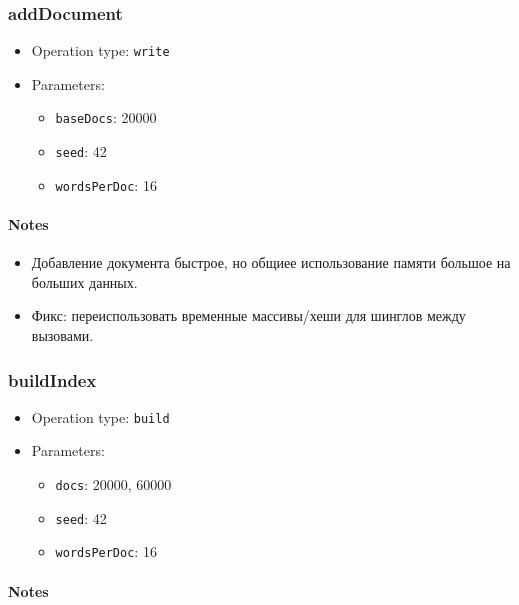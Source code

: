 \documentclass[
  10pt,
]{article}
\providecommand{\tightlist}{%
  \setlength{\itemsep}{0pt}\setlength{\parskip}{0pt}}
\begin{document}
\subsubsection{addDocument}\label{adddocument}

\begin{itemize}
\tightlist
\item
  Operation type: \texttt{write}
\item
  Parameters:

  \begin{itemize}
  \tightlist
  \item
    \texttt{baseDocs}: 20000
  \item
    \texttt{seed}: 42
  \item
    \texttt{wordsPerDoc}: 16
  \end{itemize}
\end{itemize}

\paragraph{Notes}\label{notes-6}

\begin{itemize}
\tightlist
\item
  Добавление документа быстрое, но общиее использование памяти большое
  на больших данных.
\item
  Фикс: переиспользовать временные массивы/хеши для шинглов между
  вызовами.
\end{itemize}

\subsubsection{buildIndex}\label{buildindex}

\begin{itemize}
\tightlist
\item
  Operation type: \texttt{build}
\item
  Parameters:

  \begin{itemize}
  \tightlist
  \item
    \texttt{docs}: 20000, 60000
  \item
    \texttt{seed}: 42
  \item
    \texttt{wordsPerDoc}: 16
  \end{itemize}
\end{itemize}

\paragraph{Notes}\label{notes-7}
\end{document}
